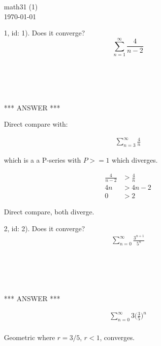 \documentclass[fleqn]{article}
\begin{document}
\begin{flushleft}
math31 (1)\\
\today
\end{flushleft}


1, id: 1).  Does it converge?\\

\begin{equation*}
\sum_{n=1}^{\infty} \frac{4}{n-2}
\end{equation*}

\begin{verbatim}





\end{verbatim}

*** ANSWER ***

Direct compare with:

\begin{align*}
\sum_{n=3}^{\infty}\frac{4}{n}
\end{align*}

which is a a P-series with $P >= 1$ which diverges.

\begin{align*}
\frac{4}{n-2} &> \frac{4}{n}\\
4n &> 4n - 2\\
0 &> 2
\end{align*}

Direct compare, both diverge.

2, id: 2).  Does it converge?\\

\begin{align*}
\sum_{n=0}^{\infty} \frac{3^{n+1}}{5^{n}}
\end{align*}

\begin{verbatim}





\end{verbatim}

*** ANSWER ***

\begin{align*}
\sum_{n=0}^{\infty} 3\Big(\frac{3}{5}\Big)^{n}\\
\end{align*}

Geometric where $r=3/5$, $r < 1$, converges.
\end{document}
